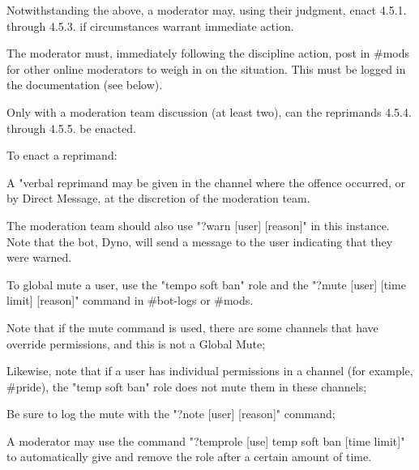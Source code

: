 \begin{longenum}[ label*=\thesubsection.\arabic*., align=left]
\begin{longenum}[label*=\arabic*., align=left]
\begin{longenum}[label*=\arabic*., align=left]
\begin{longenum}[label*=\arabic*., align=left]
				\end{longenum}	
			\end{longenum}	
		\item Notwithstanding the above, a moderator may, using their judgment, enact 4.5.1. through 4.5.3. if circumstances warrant immediate action.
			\begin{longenum}[label*=\arabic*., align=left]
			\item The moderator must, immediately following the discipline action, post in \#mods for other online moderators to weigh in on the situation. This must be logged in the documentation (see below).
			\item Only with a moderation team discussion (at least two), can the reprimands 4.5.4. through 4.5.5. be enacted.
			\end{longenum}	
		\item To enact a reprimand:
			\begin{longenum}[label*=\arabic*., align=left]
			\item A "verbal reprimand may be given in the channel where the offence occurred, or by Direct Message, at the discretion of the moderation team.
				\begin{longenum}[label*=\arabic*., align=left]
				\item The moderation team should also use "?warn [user] [reason]" in this instance. Note that the bot, Dyno, will send a message to the user indicating that they were warned.
				\end{longenum}	
			\item To global mute a user, use the "tempo soft ban" role and the "?mute [user] [time limit] [reason]" command in \#bot-logs or \#mods.
				\begin{longenum}[label*=\arabic*., align=left]
				\item Note that if the mute command is used, there are some channels that have override permissions, and this is not a Global Mute;
				\item Likewise, note that if a user has individual permissions in a channel (for example, \#pride), the "temp soft ban" role does not mute them in these channels;
				\item Be sure to log the mute with the "?note [user] [reason]" command;
				\item A moderator may use the command "?temprole [use] temp soft ban [time limit]" to automatically give and remove the role after a certain amount of time.
				\end{longenum}	

\end{longenum}
\end{longenum}
\end{longenum}
